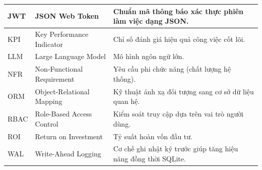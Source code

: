 \begin{spacing}{1.0}
\begin{tabularx}{\textwidth}{|L{2.3cm}|L{5.4cm}|Y|}
\hline
JWT & JSON Web Token & Chuẩn mã thông báo xác thực phiên làm việc dạng JSON.\\
\hline
KPI & Key Performance Indicator & Chỉ số đánh giá hiệu quả công việc cốt lõi.\\
\hline
LLM & Large Language Model & Mô hình ngôn ngữ lớn.\\
\hline
NFR & Non-Functional Requirement & Yêu cầu phi chức năng (chất lượng hệ thống).\\
\hline
ORM & Object-Relational Mapping & Kỹ thuật ánh xạ đối tượng sang cơ sở dữ liệu quan hệ.\\
\hline
RBAC & Role-Based Access Control & Kiểm soát truy cập dựa trên vai trò người dùng.\\
\hline
ROI & Return on Investment & Tỷ suất hoàn vốn đầu tư.\\
\hline
WAL & Write-Ahead Logging & Cơ chế ghi nhật ký trước giúp tăng hiệu năng đồng thời SQLite.\\
\hline
\end{tabularx}
\end{spacing}
